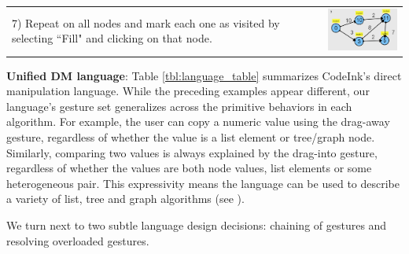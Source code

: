 \noindent \begin{tabular}{m{4.2cm} m{3.8cm}}
7) Repeat on all nodes and mark each one as visited by
selecting ``Fill" and clicking on that node.
& \includegraphics[width=3.8cm]{img/examples/dijkstra-7.png}
\end{tabular}


\noindent \textbf{Unified DM language}:
Table \ref{tbl:language_table} summarizes CodeInk's direct manipulation language.
While the preceding examples appear different, our
language's gesture set generalizes across the primitive behaviors in each
algorithm. For example, the user can copy a numeric value using the drag-away
gesture, regardless of whether the value is a list element or tree/graph node.
Similarly, comparing two values is always explained by the drag-into gesture,
regardless of whether the values are both node values, list elements or some
heterogeneous pair. This expressivity means the language can be used to describe
a variety of list, tree and graph algorithms (see
).

We turn next to two subtle language design decisions: chaining of gestures and
resolving overloaded gestures.


